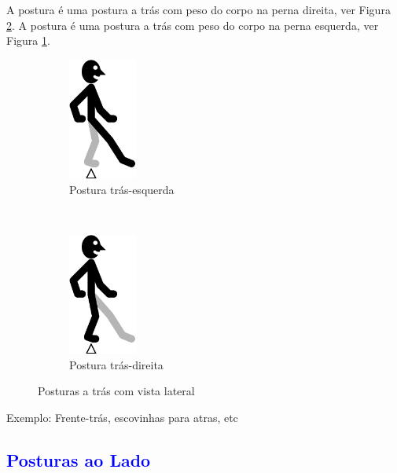 A postura  é uma postura a trás com peso do corpo na perna direita, ver Figura \ref{fig:trasdireita}.
A postura  é uma postura a trás com peso do corpo na perna esquerda, ver Figura \ref{fig:trasesquerda}.
\begin{figure}[H]
    \centering
    \begin{subfigure}[b]{0.3\textwidth}
        \includegraphics[height=4cm]{chapters/cap-partituramov-posturas/postura-ft-tras-esq.eps}
        \caption{Postura trás-esquerda}
        \label{fig:trasesquerda}
    \end{subfigure}
    ~ %
    \begin{subfigure}[b]{0.3\textwidth}
        \includegraphics[height=4cm]{chapters/cap-partituramov-posturas/postura-ft-tras-der.eps}
        \caption{Postura trás-direita}
        \label{fig:trasdireita}
    \end{subfigure}      
    \caption{Posturas a trás  com vista lateral}\label{fig:trasderesq}
\end{figure}

Exemplo: Frente-trás, escovinhas para atras, etc

\subsection{\textcolor{blue}{ Posturas ao Lado}}

